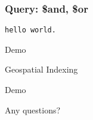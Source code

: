 \documentclass{beamer}
\begin{document}
\begin{frame}[fragile]

\frametitle{Query: \$and, \$or}

\begin{lstlisting}
hello world.
\end{lstlisting}

\end{frame}


\begin{frame}%

\begin{center}
   Demo
\end{center}

\end{frame}


\begin{frame}{Geospatial Indexing}
\end{frame}


\begin{frame}%

\begin{center}
   Demo
\end{center}

\end{frame}





\begin{frame} %

\begin{center}
   Any questions?
\end{center}

\end{frame}
\end{document}
